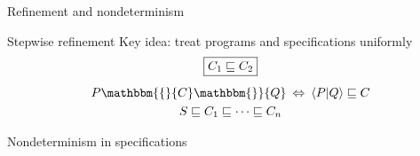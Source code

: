 \documentclass{beamer}
\newcommand{\htr}[3]{{ {#1} \mathbbm{\{} {#2} \mathbbm{\}} {#3} }}
\begin{document}
\begin{frame}{Refinement and nondeterminism} %
  \begin{block}{Stepwise refinement}
  Key idea: treat programs and specifications uniformly
  \begin{gather*}
    \fbox{$C_1 \sqsubseteq C_2$} \\[1ex]
    \htr{P}{C}{Q} \: \Leftrightarrow \:
      \langle P | Q \rangle \sqsubseteq C \\
    S \sqsubseteq C_1 \sqsubseteq \cdots \sqsubseteq C_n
  \end{gather*}
  \end{block}
  \pause
  \begin{block}{Nondeterminism in specifications}
\end{block}
\end{frame}
\end{document}
